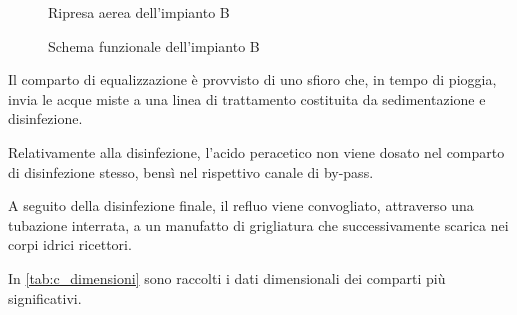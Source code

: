 \begin{figure}[h]
		\centering
	\caption{Ripresa aerea dell'impianto B}
	\label{fig:c_foto}
\end{figure}
\begin{figure}[h]
		\centering
	\caption{Schema funzionale dell'impianto B}
	\label{fig:c_schema}
\end{figure}

Il comparto di equalizzazione è provvisto di uno sfioro che, in tempo di pioggia, invia le acque miste a una linea di trattamento costituita da sedimentazione e disinfezione.

Relativamente alla disinfezione, l'acido peracetico non viene dosato nel comparto di disinfezione stesso, bensì nel rispettivo canale di by-pass.

A seguito della disinfezione finale, il refluo viene convogliato, attraverso una tubazione interrata, a un manufatto di grigliatura che successivamente scarica nei corpi idrici ricettori.

In \autoref{tab:c_dimensioni} sono raccolti i dati dimensionali dei comparti più significativi.


